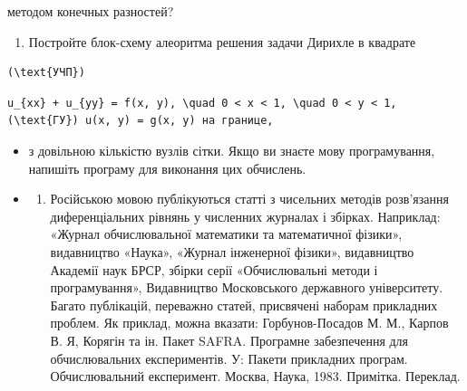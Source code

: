 \documentclass[
  ukrainian,
]{article}
\providecommand{\tightlist}{%
  \setlength{\itemsep}{0pt}\setlength{\parskip}{0pt}}
\begin{document}
методом конечных разностей?

\begin{enumerate}
\def\labelenumi{\arabic{enumi}.}
\setcounter{enumi}{5}
\tightlist
\item
  Постройте блок-схему алеоритма решения задачи Дирихле в квадрате
\end{enumerate}

\begin{verbatim}
(\text{УЧП})
\end{verbatim}

\begin{verbatim}
u_{xx} + u_{yy} = f(x, y), \quad 0 < x < 1, \quad 0 < y < 1, (\text{ГУ}) u(x, y) = g(x, y) на границе,
\end{verbatim}

\begin{itemize}
\item
  з довільною кількістю вузлів сітки. Якщо ви знаєте мову програмування,
  напишіть програму для виконання цих обчислень.
\item
  \begin{enumerate}
  \def\labelenumi{\arabic{enumi})}
  \tightlist
  \item
    Російською мовою публікуються статті з чисельних методів розв'язання
    диференціальних рівнянь у численних журналах і збірках. Наприклад:
    «Журнал обчислювальної математики та математичної фізики»,
    видавництво «Наука», «Журнал інженерної фізики», видавництво
    Академії наук БРСР, збірки серії «Обчислювальні методи і
    програмування», Видавництво Московського державного університету.
    Багато публікацій, переважно статей, присвячені наборам прикладних
    проблем. Як приклад, можна вказати: Горбунов-Посадов М. М., Карпов
    В. Я, Корягін та ін. Пакет SAFRA. Програмне забезпечення для
    обчислювальних експериментів. У: Пакети прикладних програм.
    Обчислювальний експеримент. Москва, Наука, 1983. Примітка. Переклад.
  \end{enumerate}
\end{itemize}
\end{document}
